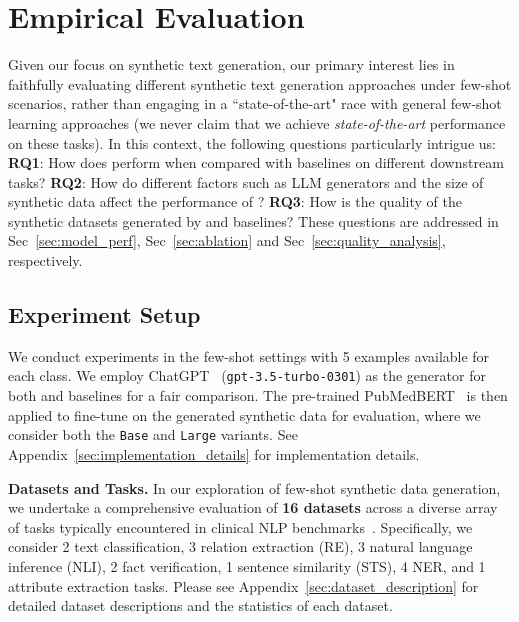 \section{Empirical Evaluation}
Given our focus on synthetic text generation, our primary interest lies in faithfully evaluating different synthetic text generation approaches under few-shot scenarios, rather than engaging in a ``state-of-the-art" race with general few-shot learning approaches (\ie we never claim that we achieve \emph{state-of-the-art} performance on these tasks). In this context, the following questions particularly intrigue us:
\textbf{RQ1}: How does {\ours} perform when compared with baselines on different downstream tasks?  
\textbf{RQ2}: How do different factors such as LLM generators and the size of synthetic data affect the performance of {\ours}? 
\textbf{RQ3}: How is the quality of the synthetic datasets generated by {\ours} and baselines?
These questions are addressed in Sec~\ref{sec:model_perf}, Sec~\ref{sec:ablation} and Sec~\ref{sec:quality_analysis}, respectively.


\subsection{Experiment Setup}
We conduct experiments in the few-shot settings with 5 examples available for each class. We employ ChatGPT~\citep{chatgpt} (\texttt{gpt-3.5-turbo-0301}) as the generator for both {\ours} and baselines for a fair comparison. The pre-trained PubMedBERT~\citep{gu2021domain} is then applied to fine-tune on the generated synthetic data for evaluation, where we consider both the \texttt{Base} and \texttt{Large} variants. See Appendix~\ref{sec:implementation_details} for implementation details.

\textbf{Datasets and Tasks.}
In our exploration of few-shot synthetic data generation, we undertake a comprehensive evaluation of \textbf{16 datasets} across a diverse array of tasks typically encountered in clinical NLP benchmarks~\citep{blue,fries2022bigbio}. Specifically, we consider 2 text classification, 3 relation extraction (RE), 3 natural language inference (NLI), 2 fact verification, 1 sentence similarity (STS), 4 NER, and 1 attribute extraction tasks. Please see Appendix~\ref{sec:dataset_description} for detailed dataset descriptions and the statistics of each dataset.

